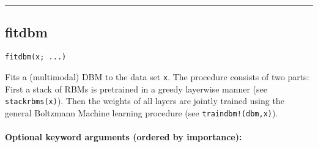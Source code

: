 \noindent\rule{\textwidth}{1pt}
\subsection*{fitdbm}
\begin{verbatim}
fitdbm(x; ...)
\end{verbatim}
Fits a (multimodal) DBM to the data set \texttt{x}. The procedure consists of two parts: First a stack of RBMs is pretrained in a greedy layerwise manner (see \texttt{stackrbms(x)}). Then the weights of all layers are jointly trained using the general Boltzmann Machine learning procedure (see \texttt{traindbm!(dbm,x)}).

\paragraph*{Optional keyword arguments (ordered by importance):}
